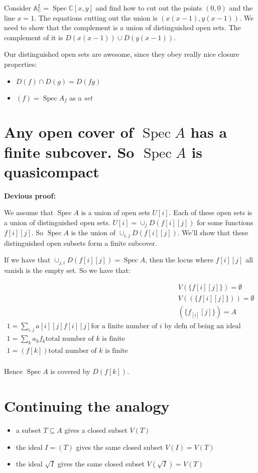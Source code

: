 \documentclass{book}
\newcommand{\C}{\ensuremath{\mathbb{C}}}
\newcommand{\A}{\ensuremath{\mathbb{A}}}
\newcommand{\spec}{\operatorname{Spec}}
\theoremstyle{definition}
\begin{document}
Consider $\A^2_\C = \spec \C[x, y]$ and find how to cut out the points $(0, 0)$
and the line $x = 1$. The equations cutting out the union is $(x(x-1), y(x-1))$.
We need to show that the complement is a union of distinguished open sets.
The complement of it is $D(x(x-1)) \cup D(y(x-1))$.


Our distinguished open sets are awesome, since they obey really nice closure
properties:
\begin{itemize}
\item $D(f) \cap D(g) = D(fg)$
\item $(f) = \spec A_f$ as a \emph{set}
\end{itemize}



\section{Any open cover of $\spec A$ has a finite subcover. So $\spec A$ is quasicompact}

\textbf{Devious proof:}

We assume that $\spec A$ is a union of open sets $U[i]$. Each of these open sets
is a union of distinguished open sets. $U[i] = \cup_j D(f[i][j])$ for some
functions $f[i][j]$. So $\spec A$
is the union of $\cup_{i, j} D(f[i][j])$. We'll show that these distinguished
open subsets form a finite subcover.

 If we have that $\cup_{j, i} D(f[i][j]) = \spec A$, then the locus where
 $f[i][j]$ all vanish is the empty set. So we have that: 

\begin{align*}
 &V(\{ f[i][j] \}) = \emptyset \\
 &V((\{ f[i][j] \})) = \emptyset \\
 &(\{ f_[i][j] \}) = A \\
 1 = \sum_{i,j} a[i][j] f[i][j] \text{for a finite number of $i$ by defn of being an ideal} \\
 1 = \sum_k a_k f_k \text{total number of $k$ is finite} \\
 1 = (f[k]) \text{total number of $k$ is finite} \\
\end{align*}

Hence $\spec A$ is covered by $D(f[k])$.

\section{Continuing the analogy}
\begin{itemize}
    \item a subset $T \subseteq A$ gives a closed subset $V(T)$
    \item the ideal $I = (T)$ gives the same closed subset $V(I) = V(T)$
    \item the ideal $\sqrt I$ gives the same closed subset $V(\sqrt I) = V(T)$
\end{itemize}
\end{document}
